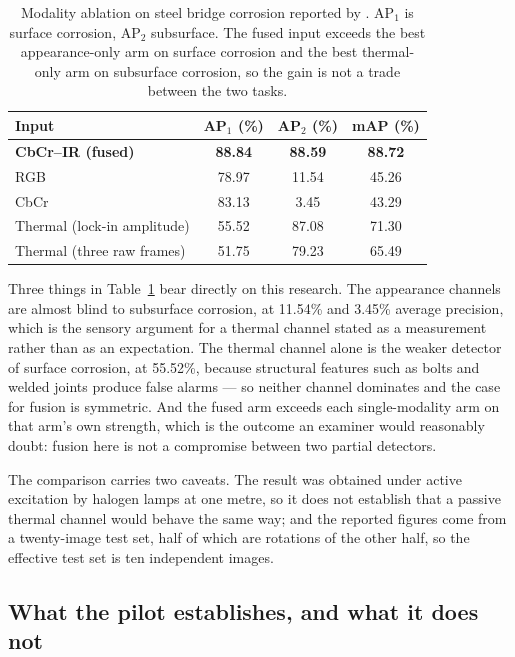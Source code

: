 \begin{table}[htbp]
\centering
\caption{Modality ablation on steel bridge corrosion reported by
\citet{Lim2021}. AP$_1$ is surface corrosion, AP$_2$ subsurface. The fused input
exceeds the best appearance-only arm on surface corrosion and the best
thermal-only arm on subsurface corrosion, so the gain is not a trade between the
two tasks.}
\label{tab:lim-ablation}
\begin{tabular}{@{}lccc@{}}
\toprule
\textbf{Input} & \textbf{AP$_1$ (\%)} & \textbf{AP$_2$ (\%)} & \textbf{mAP (\%)} \\
\midrule
\textbf{CbCr--IR (fused)} & \textbf{88.84} & \textbf{88.59} & \textbf{88.72} \\
RGB & 78.97 & 11.54 & 45.26 \\
CbCr & 83.13 & 3.45 & 43.29 \\
Thermal (lock-in amplitude) & 55.52 & 87.08 & 71.30 \\
Thermal (three raw frames) & 51.75 & 79.23 & 65.49 \\
\bottomrule
\end{tabular}
\end{table}

Three things in Table~\ref{tab:lim-ablation} bear directly on this research.
The appearance channels are almost blind to subsurface corrosion, at 11.54\% and
3.45\% average precision, which is the sensory argument for a thermal channel
stated as a measurement rather than as an expectation. The thermal channel alone
is the weaker detector of surface corrosion, at 55.52\%, because structural
features such as bolts and welded joints produce false alarms --- so neither
channel dominates and the case for fusion is symmetric. And the fused arm
exceeds each single-modality arm on that arm's own strength, which is the
outcome an examiner would reasonably doubt: fusion here is not a compromise
between two partial detectors.

The comparison carries two caveats. The result was obtained under active
excitation by halogen lamps at one metre, so it does not establish that a
passive thermal channel would behave the same way; and the reported figures
come from a twenty-image test set, half of which are rotations of the other
half, so the effective test set is ten independent images.

\subsection{What the pilot establishes, and what it does not}

